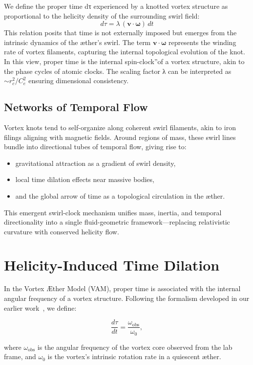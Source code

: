 We define the proper time dτ experienced by a knotted vortex structure as proportional to the helicity density of the surrounding swirl field:
$$ d\tau = \lambda \, (\mathbf{v} \cdot \boldsymbol{\omega}) \, dt $$
This relation posits that time is not externally imposed but emerges from the intrinsic dynamics of the æther's swirl. The term $\mathbf{v} \cdot \boldsymbol{\omega}$ represents the winding rate of vortex filaments, capturing the internal topological evolution of the knot. In this view, proper time is the internal \grqq spin-clock\textquotedblright of a vortex structure, akin to the phase cycles of atomic clocks. The scaling factor λ can be interpreted as $\sim r_c^2 / C_e^2$ ensuring dimensional consistency.

\subsection*{Networks of Temporal Flow}

Vortex knots tend to self-organize along coherent swirl filaments, akin to iron filings aligning with magnetic fields. Around regions of mass, these swirl lines bundle into directional tubes of temporal flow, giving rise to:
\begin{itemize}
    \item gravitational attraction as a gradient of swirl density,
    \item local time dilation effects near massive bodies,
    \item and the global arrow of time as a topological circulation in the æther.
\end{itemize}

This emergent swirl-clock mechanism unifies mass, inertia, and temporal directionality into a single fluid-geometric framework—replacing relativistic curvature with conserved helicity flow.

\section{Helicity-Induced Time Dilation}

In the Vortex Æther Model (VAM), proper time is associated with the internal angular frequency of a vortex structure. Following the formalism developed in our earlier work~\cite{iskandarani2025timedilation}, we define:

\[
\frac{d\tau}{dt} = \frac{\omega_{\text{obs}}}{\omega_0},
\]

where $\omega_{\text{obs}}$ is the angular frequency of the vortex core observed from the lab frame, and $\omega_0$ is the vortex's intrinsic rotation rate in a quiescent æther.

